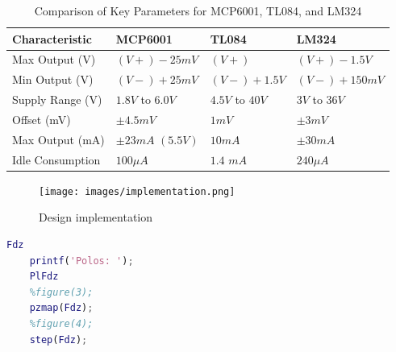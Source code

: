 \begin{table}[h]
    \centering
    \caption{Comparison of Key Parameters for MCP6001, TL084, and LM324}
    \begin{tabularx}{\textwidth}{>{\centering\arraybackslash}X >{\centering\arraybackslash}X >{\centering\arraybackslash}X >{\centering\arraybackslash}X}
        \toprule
        \textbf{Characteristic} & \textbf{MCP6001} & \textbf{TL084} & \textbf{LM324} \\
        \midrule
        Max Output (V) & $(V+)-25mV$ & $(V+)$ & $(V+) - 1.5V$ \\
        \midrule
        Min Output (V) & $(V-)+25mV$ & $(V-) + 1.5V$ & $(V-) + 150mV$ \\
        \midrule
        Supply Range (V) & $1.8V$ to $6.0V$ & $4.5V$ to $40V$ & $3V$ to $36V$ \\
        \midrule
        Offset (mV) & $\pm 4.5mV$ & $1mV$ & $\pm 3 mV$ \\
        \midrule
        Max Output (mA) & $\pm 23 mA$ $(5.5V)$ & $10 mA$ & $\pm 30 mA$ \\
        \midrule
        Idle Consumption & $100 \mu A $ & $1.4$ $mA$ & $240 \mu A$ \\
        \bottomrule
    \end{tabularx}
    \label{tab:opamp}
\end{table}

\begin{figure}[H]
    \centering
    \texttt{[image: images/implementation.png]}
    \caption{Design implementation}
    \label{fig:implementation}
\end{figure}

\begin{lstlisting}[language=Matlab, caption=Matlab code example]
    Fdz
    printf('Polos: ');
    PlFdz
    %figure(3);
    pzmap(Fdz);
    %figure(4);
    step(Fdz);
\end{lstlisting}


